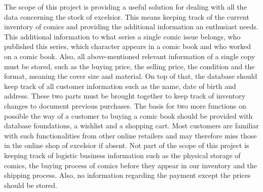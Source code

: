 The scope of this project is providing a useful solution for dealing with all the data concerning the stock of excelsior. This means keeping track of the current inventory of comics and providing the additional information an enthusiast needs. This additional information to what series a single comic issue belongs, who published this series, which character appears in a comic book and who worked on a comic book. Also, all above-mentioned relevant information of a single copy must be stored, such as the buying price, the selling price, the condition and the format, meaning the cover size and material. On top of that, the database should keep track of all customer information such as the name, date of birth and address. These two parts must be brought together to keep track of inventory changes to document previous purchases. The basis for two more functions on possible the way of a customer to buying a comic book should be provided with database foundations, a wishlist and a shopping cart. Most customers are familiar with such functionalities from other online retailers and may therefore miss those in the online shop of excelsior if absent. Not part of the scope of this project is keeping track of logistic business information such as the physical storage of comics, the buying process of comics before they appear in our inventory and the shipping process. Also, no information regarding the payment except the prices should be stored.

